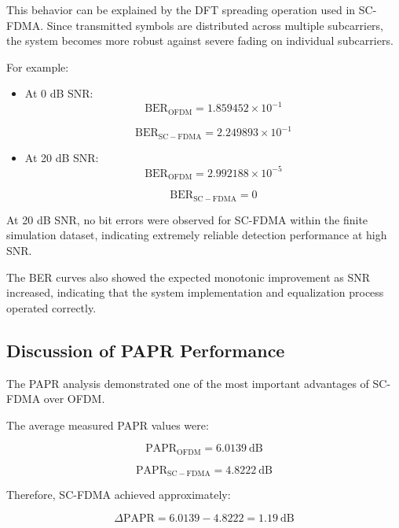 This behavior can be explained by the DFT spreading operation used in
SC-FDMA. Since transmitted symbols are distributed across multiple
subcarriers, the system becomes more robust against severe fading on
individual subcarriers.

For example:

\begin{itemize}
    \item At 0 dB SNR:
    \[
    \mathrm{BER}_{\mathrm{OFDM}} = 1.859452 \times 10^{-1}
    \]
    
    \[
    \mathrm{BER}_{\mathrm{SC-FDMA}} = 2.249893 \times 10^{-1}
    \]

    \item At 20 dB SNR:
    \[
    \mathrm{BER}_{\mathrm{OFDM}} = 2.992188 \times 10^{-5}
    \]

    \[
    \mathrm{BER}_{\mathrm{SC-FDMA}} = 0
    \]
\end{itemize}

At 20 dB SNR, no bit errors were observed for SC-FDMA within the finite
simulation dataset, indicating extremely reliable detection performance
at high SNR.

The BER curves also showed the expected monotonic improvement as SNR
increased, indicating that the system implementation and equalization
process operated correctly.

\subsection{Discussion of PAPR Performance}

The PAPR analysis demonstrated one of the most important advantages of
SC-FDMA over OFDM.

The average measured PAPR values were:

\begin{equation}
\mathrm{PAPR}_{\mathrm{OFDM}} = 6.0139 \ \mathrm{dB}
\end{equation}

\begin{equation}
\mathrm{PAPR}_{\mathrm{SC-FDMA}} = 4.8222 \ \mathrm{dB}
\end{equation}

Therefore, SC-FDMA achieved approximately:

\begin{equation}
\Delta \mathrm{PAPR}
=
6.0139 - 4.8222
=
1.19 \ \mathrm{dB}
\end{equation}


